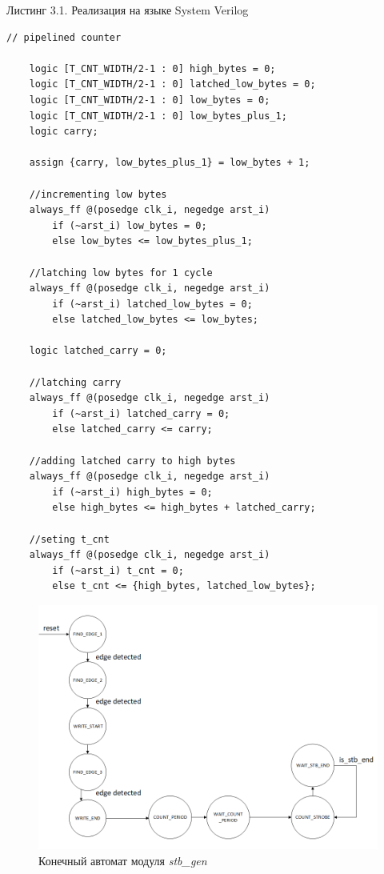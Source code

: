 \begin{flushright}
Листинг 3.1. Реализация на языке System Verilog
\end{flushright}
\lstset{
	numbersep = 5pt,
	stepnumber = 1
}
\begin{lstlisting}
// pipelined counter

	logic [T_CNT_WIDTH/2-1 : 0] high_bytes = 0;
	logic [T_CNT_WIDTH/2-1 : 0] latched_low_bytes = 0;
	logic [T_CNT_WIDTH/2-1 : 0] low_bytes = 0;
	logic [T_CNT_WIDTH/2-1 : 0] low_bytes_plus_1;
	logic carry;

	assign {carry, low_bytes_plus_1} = low_bytes + 1;

	//incrementing low bytes
	always_ff @(posedge clk_i, negedge arst_i) 
		if (~arst_i) low_bytes = 0;
		else low_bytes <= low_bytes_plus_1;

	//latching low bytes for 1 cycle
	always_ff @(posedge clk_i, negedge arst_i) 
		if (~arst_i) latched_low_bytes = 0;
		else latched_low_bytes <= low_bytes;

	logic latched_carry = 0;

	//latching carry
	always_ff @(posedge clk_i, negedge arst_i) 
		if (~arst_i) latched_carry = 0;
		else latched_carry <= carry;

	//adding latched carry to high bytes
	always_ff @(posedge clk_i, negedge arst_i)
		if (~arst_i) high_bytes = 0;
		else high_bytes <= high_bytes + latched_carry;

	//seting t_cnt
	always_ff @(posedge clk_i, negedge arst_i) 
		if (~arst_i) t_cnt = 0;
		else t_cnt <= {high_bytes, latched_low_bytes};
\end{lstlisting}

\begin{figure}[ht!] 
	\center
	\includegraphics [scale=0.7] {my_folder/images//stb_gen_fsm}
	\caption{Конечный автомат модуля \emph{stb\_gen}} 
	\label{fig:stb-gen-fsm}  
\end{figure}

